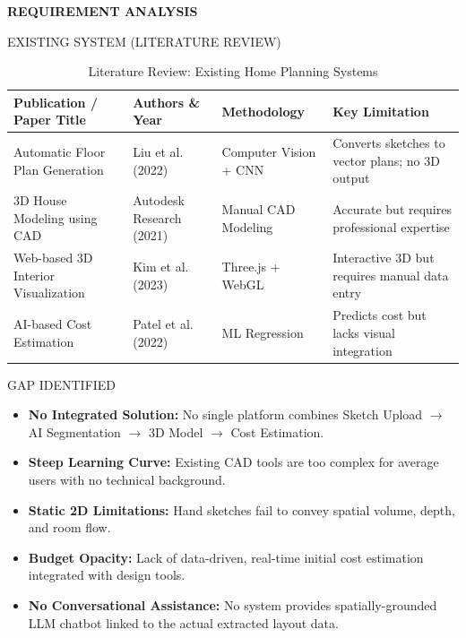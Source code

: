 \documentclass[aspectratio=169]{beamer}
\begin{document}
\begin{frame}
\centering
\Huge \textbf{REQUIREMENT ANALYSIS}
\end{frame}

\begin{frame}{EXISTING SYSTEM (LITERATURE REVIEW)}
\scriptsize
\begin{table}
\centering
\begin{tabular}{p{3.2cm} p{2.4cm} p{3.2cm} p{4cm}}
\toprule
\textbf{Publication / Paper Title} & \textbf{Authors \& Year} & \textbf{Methodology} & \textbf{Key Limitation} \\
\midrule
Automatic Floor Plan Generation &
Liu et al. (2022) &
Computer Vision + CNN &
Converts sketches to vector plans; no 3D output \\
3D House Modeling using CAD &
Autodesk Research (2021) &
Manual CAD Modeling &
Accurate but requires professional expertise \\
Web-based 3D Interior Visualization &
Kim et al. (2023) &
Three.js + WebGL &
Interactive 3D but requires manual data entry \\
AI-based Cost Estimation &
Patel et al. (2022) &
ML Regression &
Predicts cost but lacks visual integration \\
\bottomrule
\end{tabular}
\caption{Literature Review: Existing Home Planning Systems}
\end{table}
\end{frame}

\begin{frame}{GAP IDENTIFIED}
\begin{itemize}
  \item \textbf{No Integrated Solution:} No single platform combines Sketch Upload $\rightarrow$ AI Segmentation $\rightarrow$ 3D Model $\rightarrow$ Cost Estimation.
  \item \textbf{Steep Learning Curve:} Existing CAD tools are too complex for average users with no technical background.
  \item \textbf{Static 2D Limitations:} Hand sketches fail to convey spatial volume, depth, and room flow.
  \item \textbf{Budget Opacity:} Lack of data-driven, real-time initial cost estimation integrated with design tools.
  \item \textbf{No Conversational Assistance:} No system provides spatially-grounded LLM chatbot linked to the actual extracted layout data.
\end{itemize}
\end{frame}
\end{document}
